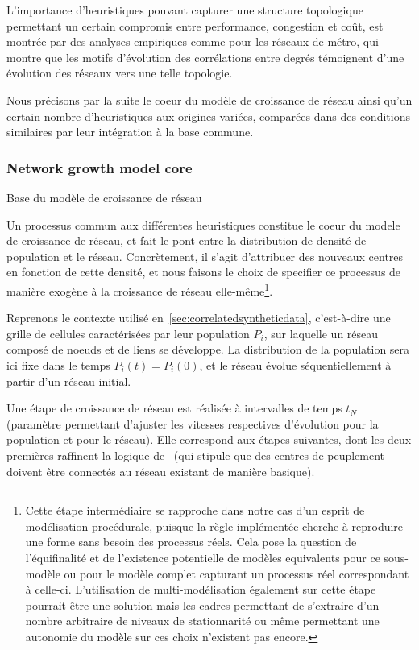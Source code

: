 L'importance d'heuristiques pouvant capturer une structure topologique permettant un certain compromis entre performance, congestion et coût, est montrée par des analyses empiriques comme \cite{2012arXiv1202.1747W} pour les réseaux de métro, qui montre que les motifs d'évolution des corrélations entre degrés témoignent d'une évolution des réseaux vers une telle topologie.


Nous précisons par la suite le coeur du modèle de croissance de réseau ainsi qu'un certain nombre d'heuristiques aux origines variées, comparées dans des conditions similaires par leur intégration à la base commune.


\subsubsection{Network growth model core}{Base du modèle de croissance de réseau}


Un processus commun aux différentes heuristiques constitue le coeur du modele de croissance de réseau, et fait le pont entre la distribution de densité de population et le réseau. Concrètement, il s'agit d'attribuer des nouveaux centres en fonction de cette densité, et nous faisons le choix de specifier ce processus de manière exogène à la croissance de réseau elle-même\footnote{Cette étape intermédiaire se rapproche dans notre cas d'un esprit de modélisation procédurale, puisque la règle implémentée cherche à reproduire une forme sans besoin des processus réels. Cela pose la question de l'équifinalité et de l'existence potentielle de modèles equivalents pour ce sous-modèle ou pour le modèle complet capturant un processus réel correspondant à celle-ci. L'utilisation de multi-modélisation également sur cette étape pourrait être une solution mais les cadres permettant de s'extraire d'un nombre arbitraire de niveaux de stationnarité ou même permettant une autonomie du modèle sur ces choix n'existent pas encore.}.


Reprenons le contexte utilisé en~\ref{sec:correlatedsyntheticdata}, c'est-à-dire une grille de cellules caractérisées par leur population $P_i$, sur laquelle un réseau composé de noeuds et de liens se développe. La distribution de la population sera ici fixe dans le temps $P_i(t) = P_i(0)$, et le réseau évolue séquentiellement à partir d'un réseau initial.

Une étape de croissance de réseau est réalisée à intervalles de temps $t_N$ (paramètre permettant d'ajuster les vitesses respectives d'évolution pour la population et pour le réseau). Elle correspond aux étapes suivantes, dont les deux premières raffinent la logique de~\cite{raimbault2014hybrid} (qui stipule que des centres de peuplement doivent être connectés au réseau existant de manière basique).

